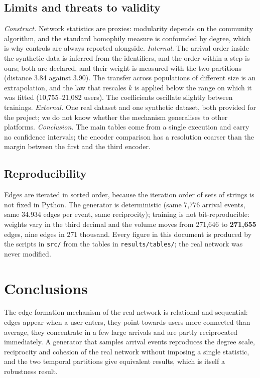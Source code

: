 \documentclass[11pt,a4paper]{article}
\newcommand{\code}[1]{\texttt{\small #1}}
\begin{document}
\subsection{Limits and threats to validity}
\emph{Construct.} Network statistics are proxies: modularity depends on the community algorithm, and the
standard homophily measure is confounded by degree, which is why controls are always reported alongside.
\emph{Internal.} The arrival order inside the synthetic data is inferred from the identifiers, and the
order within a step is ours; both are declared, and their weight is measured with the two partitions
(distance 3.84 against 3.90). The transfer across populations of different size is an extrapolation, and
the law that rescales $k$ is applied below the range on which it was fitted (10,755--21,082 users). The
coefficients oscillate slightly between trainings.
\emph{External.} One real dataset and one synthetic dataset, both provided for the project; we do not know
whether the mechanism generalises to other platforms.
\emph{Conclusion.} The main tables come from a single execution and carry no confidence intervals; the
encoder comparison has a resolution coarser than the margin between the first and the third encoder.

\subsection{Reproducibility}
Edges are iterated in sorted order, because the iteration order of sets of strings is not fixed in
Python. The generator is deterministic (same 7,776 arrival events, same 34.934 edges per event, same
reciprocity); training is not bit-reproducible: weights vary in the third decimal and the volume moves
from 271,646 to \textbf{271,655} edges, nine edges in 271 thousand. Every figure in this document is
produced by the scripts in \code{src/} from the tables in \code{results/tables/}; the real network was never
modified.

\section{Conclusions}
The edge-formation mechanism of the real network is relational and sequential: edges appear when a user
enters, they point towards users more connected than average, they concentrate in a few large arrivals
and are partly reciprocated immediately. A generator that samples arrival events reproduces the
degree scale, reciprocity and cohesion of the real network without imposing a single statistic, and the
two temporal partitions give equivalent results, which is itself a robustness result.
\end{document}
